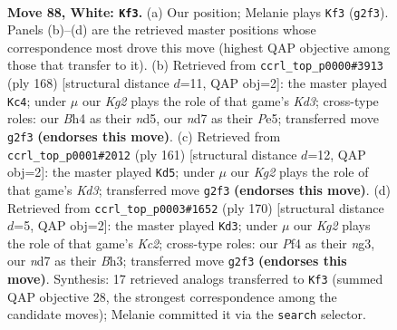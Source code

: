 \documentclass[11pt]{article}
\begin{document}
\clearpage

\begin{figure}[p]\centering
\begin{subfigure}{0.46\textwidth}\centering
\resizebox{\linewidth}{!}{%
\newchessgame
\chessboard[
  setfen={6k1/3n4/8/8/p4P1B/P6P/6K1/8 w - - 2 88},
  showmover=false,
  pgfstyle=straightmove, color=movearrow, markmove={g2-f3}
]}
\caption{}
\end{subfigure}\hfill
\begin{subfigure}{0.46\textwidth}\centering
\resizebox{\linewidth}{!}{%
\newchessgame
\chessboard[
  setfen={5k2/2p5/8/3nP2B/3P4/3K4/8/8 w - - 29 85},
  showmover=false,
  pgfstyle=straightmove, color=movearrow, markmove={d3-c4}
]}
\caption{}
\end{subfigure}
\\[4pt]
\begin{subfigure}{0.46\textwidth}\centering
\resizebox{\linewidth}{!}{%
\newchessgame
\chessboard[
  setfen={8/8/2pk4/p7/P4P2/3K4/8/8 b - - 0 81},
  showmover=false,
  pgfstyle=straightmove, color=movearrow, markmove={d6-d5}
]}
\caption{}
\end{subfigure}\hfill
\begin{subfigure}{0.46\textwidth}\centering
\resizebox{\linewidth}{!}{%
\newchessgame
\chessboard[
  setfen={8/8/3k4/p7/8/2P3nB/P1K5/8 w - - 45 86},
  showmover=false,
  pgfstyle=straightmove, color=movearrow, markmove={c2-d3}
]}
\caption{}
\end{subfigure}
\caption{\textbf{Move 88, White: \texttt{Kf3}.} (a) Our position; Melanie plays \texttt{Kf3} (\texttt{g2f3}). Panels (b)--(d) are the retrieved master positions whose correspondence most drove this move (highest QAP objective among those that transfer to it). (b) Retrieved from \texttt{ccrl\_top\_p0000\#3913} (ply 168) [structural distance $d$=11, QAP obj=2]: the master played \texttt{Kc4}; under $\mu$ our \emph{Kg2} plays the role of that game's \emph{Kd3}; cross-type roles: our \emph{B}h4 as their \emph{n}d5, our \emph{n}d7 as their \emph{P}e5; transferred move \texttt{g2f3} \textbf{(endorses this move)}. (c) Retrieved from \texttt{ccrl\_top\_p0001\#2012} (ply 161) [structural distance $d$=12, QAP obj=2]: the master played \texttt{Kd5}; under $\mu$ our \emph{Kg2} plays the role of that game's \emph{Kd3}; transferred move \texttt{g2f3} \textbf{(endorses this move)}. (d) Retrieved from \texttt{ccrl\_top\_p0003\#1652} (ply 170) [structural distance $d$=5, QAP obj=2]: the master played \texttt{Kd3}; under $\mu$ our \emph{Kg2} plays the role of that game's \emph{Kc2}; cross-type roles: our \emph{P}f4 as their \emph{n}g3, our \emph{n}d7 as their \emph{B}h3; transferred move \texttt{g2f3} \textbf{(endorses this move)}. Synthesis: 17 retrieved analogs transferred to \texttt{Kf3} (summed QAP objective 28, the strongest correspondence among the candidate moves); Melanie committed it via the \texttt{search} selector.}
\label{fig:thought-m174}
\end{figure}
\end{document}
